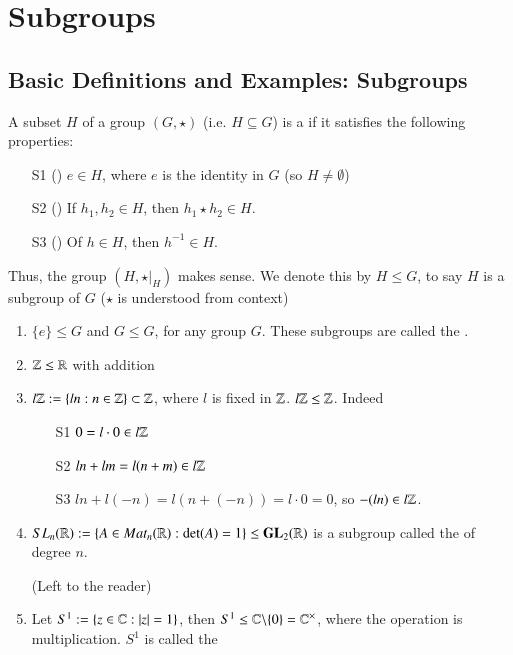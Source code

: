 \documentclass[12pt, a4paper, twoside, openright, titlepage]{book}
\begin{document}
\chapter{\textsection\textsection Subgroups}

\section{\textsection Basic Definitions and Examples: Subgroups}

\begin{defn}{}{}
    A subset $H$ of a group $(G,\star)$ (i.e. $H \subseteq G$) is a  if it satisfies the following properties:
    \begin{enumerate}
        \item[S1] () $e \in H$, where $e$ is the identity in $G$ (so $H \neq \emptyset$)
        \item[S2] () If $h_1,h_2 \in H$, then $h_1\star h_2 \in H$.
        \item[S3] () Of $h \in H$, then $h^{-1} \in H$.
    \end{enumerate}
    Thus, the group $(H,\star\vert_{H})$ makes sense. We denote this by $H \leq G$, to say $H$ is a subgroup of $G$ ($\star$ is understood from context)
\end{defn}

\begin{eg}{}{}
    \leavevmode
    \begin{enumerate}
        \item $\{e\} \leq G$ and $G \leq G$, for any group $G$. These subgroups are called the .
        \item $\mathbb Z\leq \mathbb R$ with addition
        \item $l\mathbb Z := \{ln:n \in \mathbb Z\}\subset \mathbb Z$, where $l$ is fixed in $\mathbb Z$. $l\mathbb Z \leq \mathbb Z$. Indeed \begin{enumerate}
            \item[S1] $0 = l\cdot 0 \in l\mathbb Z$
            \item[S2] $ln+lm = l(n+m) \in l\mathbb Z$
            \item[S3] $ln + l(-n) = l(n+(-n)) = l\cdot 0 = 0$, so $-(ln) \in l\mathbb Z$.
        \end{enumerate}
        \item $SL_n(\mathbb R) := \{A \in Mat_n(\mathbb R):\det(A) = 1\} \leq \mathbf{GL}_2(\mathbb R)$ is a subgroup called the  of degree $n$.
        \begin{proof*}{}{}
            (Left to the reader)
        \end{proof*}
        \item Let $S^1 := \{z \in \mathbb C:|z| = 1\}$, then $S^1 \leq \mathbb C\backslash\{0\} = \mathbb C^{\times}$, where the operation is multiplication. $S^1$ is called the 
    \end{enumerate}
\end{eg}
\end{document}
